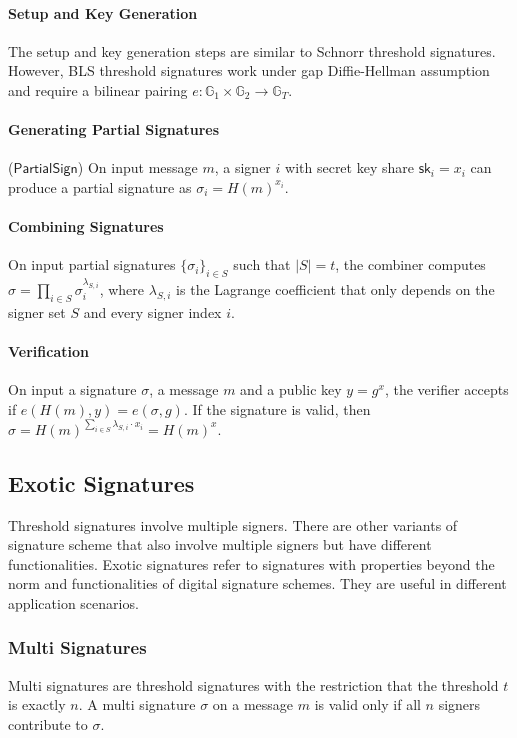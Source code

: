 \paragraph{Setup and Key Generation} The setup and key generation steps are similar to Schnorr threshold signatures. However, BLS threshold signatures work under gap Diffie-Hellman assumption and require a bilinear pairing $e:\mathbb{G}_1\times \mathbb{G}_2\to \mathbb{G}_T$. 

\paragraph{Generating Partial Signatures} ($\mathsf{PartialSign}$) On input message $m$, a signer $i$ with secret key share $\mathsf{sk}_i = x_i$ can produce a partial signature as $\sigma_i = H(m)^{x_i}$. 

\paragraph{Combining Signatures} On input partial signatures $\{\sigma_i\}_{i\in S}$ such that $|S|=t$, the combiner computes $\sigma = \prod_{i\in S} \sigma_i^{\lambda_{S, i}}$, where $\lambda_{S,i}$ is the Lagrange coefficient that only depends on the signer set $S$ and every signer index $i$. 

\paragraph{Verification} On input a signature $\sigma$, a message $m$ and a public key $y=g^x$, the verifier accepts if $e(H(m), y) = e(\sigma, g)$. If the signature is valid, then $\sigma = H(m)^{\sum_{i\in S} \lambda_{S, i} \cdot x_i} = H(m)^x$. 


\subsection{Exotic Signatures}
Threshold signatures involve multiple signers. There are other variants of signature scheme that also involve multiple signers but have different functionalities. Exotic signatures refer to signatures with properties beyond the norm and functionalities of digital signature schemes. They are useful in different application scenarios. 

\subsubsection{Multi Signatures} \label{subsubsec:multisig}
Multi signatures are threshold signatures with the restriction that the threshold $t$ is exactly $n$. A multi signature $\sigma$ on a message $m$ is valid only if all $n$ signers contribute to $\sigma$. 

